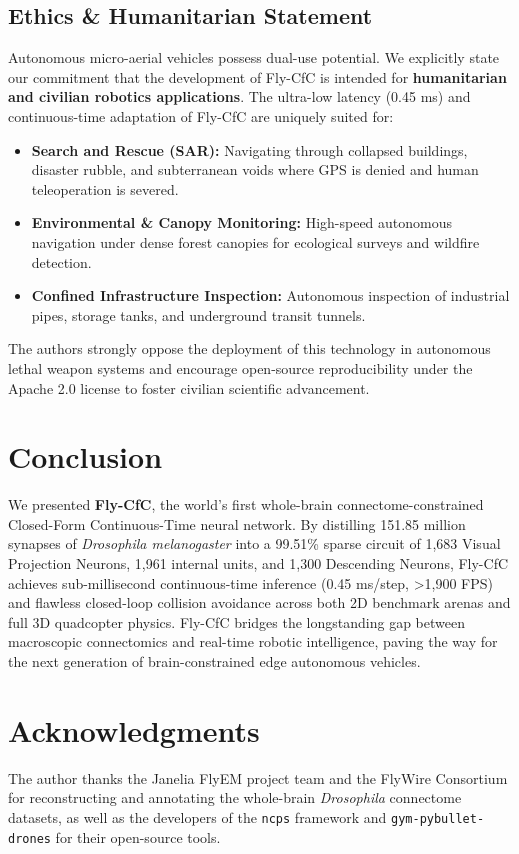 \documentclass{article}
\begin{document}
\subsection{Ethics \& Humanitarian Statement}
Autonomous micro-aerial vehicles possess dual-use potential. We explicitly state our commitment that the development of Fly-CfC is intended for \textbf{humanitarian and civilian robotics applications}. The ultra-low latency (0.45 ms) and continuous-time adaptation of Fly-CfC are uniquely suited for:
\begin{itemize}
    \item \textbf{Search and Rescue (SAR):} Navigating through collapsed buildings, disaster rubble, and subterranean voids where GPS is denied and human teleoperation is severed.
    \item \textbf{Environmental \& Canopy Monitoring:} High-speed autonomous navigation under dense forest canopies for ecological surveys and wildfire detection.
    \item \textbf{Confined Infrastructure Inspection:} Autonomous inspection of industrial pipes, storage tanks, and underground transit tunnels.
\end{itemize}
The authors strongly oppose the deployment of this technology in autonomous lethal weapon systems and encourage open-source reproducibility under the Apache 2.0 license to foster civilian scientific advancement.

\section{Conclusion}
We presented \textbf{Fly-CfC}, the world's first whole-brain connectome-constrained Closed-Form Continuous-Time neural network. By distilling 151.85 million synapses of \emph{Drosophila melanogaster} into a 99.51\% sparse circuit of 1,683 Visual Projection Neurons, 1,961 internal units, and 1,300 Descending Neurons, Fly-CfC achieves sub-millisecond continuous-time inference (0.45 ms/step, >1,900 FPS) and flawless closed-loop collision avoidance across both 2D benchmark arenas and full 3D quadcopter physics. Fly-CfC bridges the longstanding gap between macroscopic connectomics and real-time robotic intelligence, paving the way for the next generation of brain-constrained edge autonomous vehicles.

\section*{Acknowledgments}
The author thanks the Janelia FlyEM project team and the FlyWire Consortium for reconstructing and annotating the whole-brain \emph{Drosophila} connectome datasets, as well as the developers of the \texttt{ncps} framework and \texttt{gym-pybullet-drones} for their open-source tools.
\end{document}
